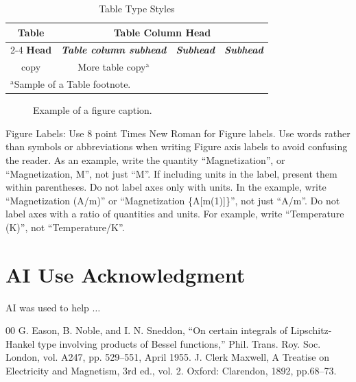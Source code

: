 \documentclass[conference]{IEEEtran}
\begin{document}
\begin{table}[htbp]
\caption{Table Type Styles}
\begin{center}
\begin{tabular}{|c|c|c|c|}
\hline
\textbf{Table}&\multicolumn{3}{|c|}{\textbf{Table Column Head}} \\
\cline{2-4} 
\textbf{Head} & \textbf{\textit{Table column subhead}}& \textbf{\textit{Subhead}}& \textbf{\textit{Subhead}} \\
\hline
copy& More table copy$^{\mathrm{a}}$& &  \\
\hline
\multicolumn{4}{l}{$^{\mathrm{a}}$Sample of a Table footnote.}
\end{tabular}
\label{tab1}
\end{center}
\end{table}

\begin{figure}[htbp]
\caption{Example of a figure caption.}
\label{fig}
\end{figure}

Figure Labels: Use 8 point Times New Roman for Figure labels. Use words 
rather than symbols or abbreviations when writing Figure axis labels to 
avoid confusing the reader. As an example, write the quantity 
``Magnetization'', or ``Magnetization, M'', not just ``M''. If including 
units in the label, present them within parentheses. Do not label axes only 
with units. In the example, write ``Magnetization (A/m)'' or ``Magnetization 
\{A[m(1)]\}'', not just ``A/m''. Do not label axes with a ratio of 
quantities and units. For example, write ``Temperature (K)'', not 
``Temperature/K''.

\section*{AI Use Acknowledgment}

AI was used to help $\ldots$


\begin{thebibliography}{00}
 G. Eason, B. Noble, and I. N. Sneddon, ``On certain integrals of Lipschitz-Hankel type involving products of Bessel functions,'' Phil. Trans. Roy. Soc. London, vol. A247, pp. 529--551, April 1955.
 J. Clerk Maxwell, A Treatise on Electricity and Magnetism, 3rd ed., vol. 2. Oxford: Clarendon, 1892, pp.68--73.
\end{thebibliography}
\end{document}
